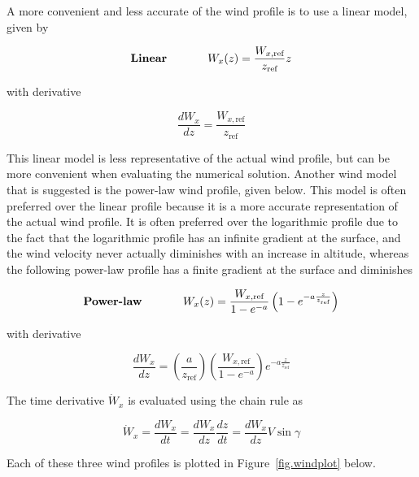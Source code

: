 \documentclass[11pt,letterpaper,onecolumn]{article}
\begin{document}
A more convenient and less accurate of the wind profile is to use a linear model, given by

\begin{equation*}
  \mbox{\textbf{Linear}}
  \hspace{0.5in}
  W_{x}(z)=\frac{W_{x,\text{ref}}}{z_{\text{ref}}}z
\end{equation*}

with derivative

\begin{equation*}
  \frac{dW_{x}}{dz}=\frac{W_{x,\text{ref}}}{z_{\text{ref}}}
\end{equation*}

This linear model is less representative of the actual wind profile, but can be more convenient when evaluating the numerical solution.
Another wind model that is suggested is the power-law wind profile,\cite{barnes.howflies.2004} given below.
This model is often preferred over the linear profile because it is a more accurate representation of the actual wind profile.
It is often preferred over the logarithmic profile due to the fact that the logarithmic profile has an infinite gradient at the surface, and the wind velocity never actually diminishes with an increase in altitude, whereas the following power-law profile has a finite gradient at the surface and diminishes

\begin{equation*}
  \mbox{\textbf{Power-law}}
  \hspace{0.5in}
  W_{x}(z)=\frac{W_{x,\text{ref}}}{1-e^{-a}}\left(1-e^{-a\frac{z}{z_{\text{ref}}}}\right)
\end{equation*}

with derivative

\begin{equation*}
  \frac{dW_{x}}{dz}=\left(\frac{a}{z_{\text{ref}}}\right)\left(\frac{W_{x,\text{ref}}}{1-e^{-a}}\right)e^{-a\frac{z}{z_{\text{ref}}}}
\end{equation*}

The time derivative $\dot{W}_{x}$ is evaluated using the chain rule as

\begin{equation*}
  \dot{W}_{x}=\frac{dW_{x}}{dt}=\frac{dW_{x}}{dz}\frac{dz}{dt}=\frac{dW_{x}}{dz}V\sin\gamma
\end{equation*}

Each of these three wind profiles is plotted in Figure~\ref{fig.windplot} below.
\end{document}
